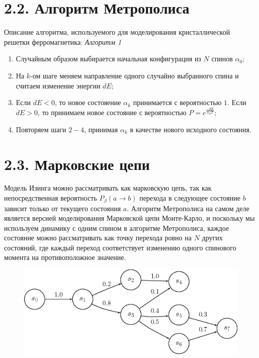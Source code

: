 \documentclass[12pt]{report}
\theoremstyle{definition}
\begin{document}
\section{2.2. Алгоритм Метрополиса}
Описание алгоритма, используемого для моделирования кристаллической решетки ферромагнетика:
\emph{Алгоритм 1}
\begin{enumerate}
    \item Случайным образом выбирается начальная конфигурация из $N$ спинов $\alpha_0$;
    \item На $k$-ом шаге меняем направление одного случайно выбранного спина и считаем изменение энергии $dE$;
    \item Если $dE < 0$, то новое состояение $\alpha_k$ принимается с вероятностью $1$. 
    Если $dE > 0$, то принимаем новое состояние с вероятностью $P = e^{\frac{-dE}{k_B T}}$;
    \item Повторяем шаги $2-4$, принимая $\alpha_k$ в качестве нового исходного состояния.
    \label{alg_metropolis}
\end{enumerate}
\newpage
\section{2.3. Марковские цепи}
Модель Изинга можно рассматривать как марковскую цепь, так как непосредственная вероятность $P_{\beta}(a \rightarrow b)$ перехода в следующее состояние
$b$ зависит только от текущего состояния $a$. Алгоритм Метрополиса на самом деле является версией моделирования Марковской цепи Монте-Карло, и поскольку мы используем динамику с одним
спином в алгоритме Метрополиса, каждое состояние можно рассматривать как точку перехода ровно на $N$ других состояний, где каждый переход соответствует изменению одного спинового момента на противоположное значение.


\begin{figure}[htbp]
    \centering
    \includegraphics[scale=0.5]{img/markov_chain.png}
\end{figure}
\end{document}
